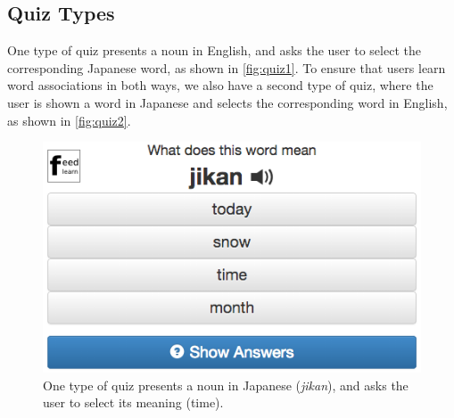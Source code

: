\documentclass{sigchi}
\begin{document}



\subsection{Quiz Types}

One type of quiz presents a noun in English, and asks the user to select the corresponding Japanese word, as shown in \autoref{fig:quiz1}. To ensure that users learn word associations in both ways, we also have a second type of quiz, where the user is shown a word in Japanese and selects the corresponding word in English, as shown in \autoref{fig:quiz2}.

\begin{figure}
\centering
\includegraphics[width=1.0\columnwidth]{quiz1}
\caption{One type of quiz presents a noun in Japanese (\textit{jikan}), and asks the user to select its meaning (time).}
\label{fig:quiz1}
\end{figure}
\end{document}
